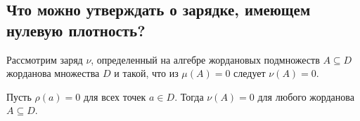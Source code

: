 \subsection{Что можно утверждать о зарядке, имеющем нулевую плотность?}

Рассмотрим заряд $\nu$, определенный на алгебре жордановых подмножеств $A \subseteq D$ жорданова множества $D$ и такой, что из $\mu(A) = 0$ следует $\nu(A) = 0$.

\begin{theorem*}
    Пусть $\rho(a) = 0$ для всех точек $a \in D$. Тогда $\nu(A) = 0$ для любого жорданова $A \subseteq D$.
\end{theorem*}

